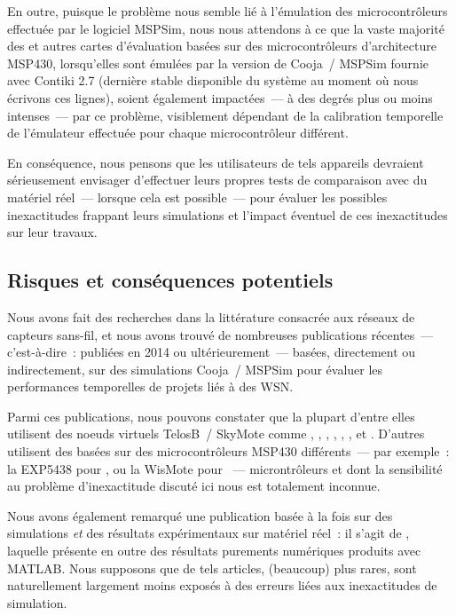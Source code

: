 \medskip

En outre, puisque le problème nous semble lié à l'émulation des
microcontrôleurs effectuée par le logiciel MSPSim, nous nous attendons
à ce que la vaste majorité des  et autres cartes d'évaluation
basées sur des microcontrôleurs d'architecture MSP430, lorsqu'elles sont
émulées par la version de Cooja~/ MSPSim fournie avec Contiki 2.7
(dernière  stable disponible du système au moment où
nous écrivons ces lignes), soient également impactées~--- à des degrés
plus ou moins intenses~--- par ce problème, visiblement dépendant
de la calibration temporelle de l'émulateur effectuée pour
chaque microcontrôleur différent.

En conséquence, nous pensons que les utilisateurs de tels appareils
devraient sérieusement envisager d'effectuer leurs propres tests de
comparaison avec du matériel réel~--- lorsque cela est possible~---
pour évaluer les possibles inexactitudes frappant leurs simulations
et l'impact éventuel de ces inexactitudes sur leur travaux.


\subsection{Risques et conséquences potentiels}
\label{SubsecConseqInexactMSPSim}

Nous avons fait des recherches dans la littérature consacrée aux réseaux
de capteurs sans-fil, et nous avons trouvé de nombreuses publications
récentes~--- c'est-à-dire~: publiées en 2014 ou ultérieurement~--- basées,
directement ou indirectement, sur des simulations Cooja~/ MSPSim pour
évaluer les performances temporelles de projets liés à des WSN.

Parmi ces publications, nous pouvons constater que la plupart d'entre
elles utilisent des noeuds virtuels TelosB~/ SkyMote comme
\cite{Constrain-Routing-Trees-2014},
\cite{Co-RPL-2014}, \cite{DINAS-2014},
\cite{Efficient-Distrib-Svc-Discovery-2014},
\cite{IETF-Routing-WSN-2014},
\cite{TinySDN-2014}, \cite{Trickle-L2-2014}
et \cite{Visual-Sensor-Networks-2014}.
D'autres utilisent des  basées sur des microcontrôleurs
MSP430 différents~--- par exemple~: la  EXP5438 pour
\cite{Key-Mgmt-2015}, ou la WisMote pour
\cite{Lightweight-Multicast-Forwarding-2014}~--- microntrôleurs et
 dont la sensibilité au problème d'inexactitude discuté ici
nous est totalement inconnue.

Nous avons également remarqué une publication basée à la fois sur des
simulations \emph{et} des résultats expérimentaux sur matériel réel~:
il s'agit de \cite{Probing-Mech-wu-2015}, laquelle présente en outre des
résultats purements numériques produits avec MATLAB. Nous supposons que
de tels articles, (beaucoup) plus rares, sont naturellement largement
moins exposés à des erreurs liées aux inexactitudes de simulation.

